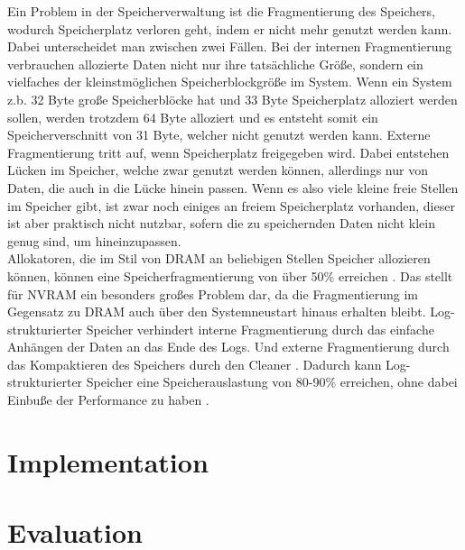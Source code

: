 \documentclass{class/thesis}
\begin{document}
\begin{thesis}
	Ein Problem in der Speicherverwaltung ist die Fragmentierung des Speichers, wodurch Speicherplatz \glqq{}verloren\grqq{} geht, indem er nicht mehr genutzt werden kann. Dabei unterscheidet man zwischen zwei Fällen.
	Bei der internen Fragmentierung verbrauchen allozierte Daten nicht nur ihre tatsächliche Größe, sondern ein vielfaches der kleinstmöglichen Speicherblockgröße im System. Wenn ein System z.b. 32 Byte große Speicherblöcke hat und 33 Byte Speicherplatz alloziert werden sollen, werden trotzdem 64 Byte alloziert und es entsteht somit ein Speicherverschnitt von 31 Byte, welcher nicht genutzt werden kann.
	Externe Fragmentierung tritt auf, wenn Speicherplatz freigegeben wird. Dabei entstehen Lücken im Speicher, welche zwar genutzt werden können, allerdings nur von Daten, die auch in die Lücke hinein passen. Wenn es also viele kleine freie Stellen im Speicher gibt, ist zwar noch einiges an freiem Speicherplatz vorhanden, dieser ist aber praktisch nicht nutzbar, sofern die zu speichernden Daten nicht klein genug sind, um hineinzupassen.\\
	Allokatoren, die im Stil von DRAM an beliebigen Stellen Speicher allozieren können, können eine Speicherfragmentierung von über 50\% erreichen \cite{Rumble:FAST14}. Das stellt für NVRAM ein besonders großes Problem dar, da die Fragmentierung im Gegensatz zu DRAM auch über den Systemneustart hinaus erhalten bleibt.
	Log-strukturierter Speicher verhindert interne Fragmentierung durch das einfache Anhängen der Daten an das Ende des Logs. Und externe Fragmentierung durch das Kompaktieren des Speichers durch den Cleaner \cite{HU:ATC17}. 
	Dadurch kann Log-strukturierter Speicher eine Speicherauslastung von 80-90\% erreichen, ohne dabei Einbuße der Performance zu haben \cite{Rumble:FAST14}. 


	
	\chapter{Implementation}




	\chapter{Evaluation}





  \end{thesis}
\end{document}
